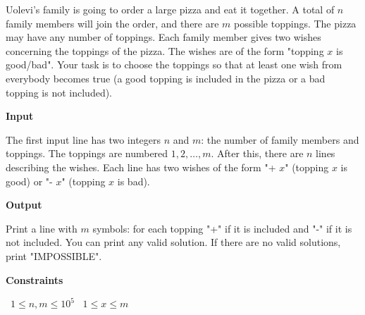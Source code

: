 Uolevi's family is going to order a large pizza and eat it together. A total of $n$ family members will join the order, and there are $m$ possible toppings. The pizza may have any number of toppings.
Each family member gives two wishes concerning the toppings of the pizza. The wishes are of the form "topping $x$ is good/bad". Your task is to choose the toppings so that at least one wish from everybody becomes true (a good topping is included in the pizza or a bad topping is not included).

\vspace{0.3cm}\noindent\textbf{Input}

The first input line has two integers $n$ and $m$: the number of family members and toppings. The toppings are numbered $1,2,\dots,m$.
After this, there are $n$ lines describing the wishes. Each line has two wishes of the form "+ $x$" (topping $x$ is good) or "- $x$" (topping $x$ is bad).

\vspace{0.3cm}\noindent\textbf{Output}

Print a line with $m$ symbols: for each topping "+" if it is included and "-" if it is not included. You can print any valid solution.
If there are no valid solutions, print "IMPOSSIBLE".

\vspace{0.3cm}\noindent\textbf{Constraints}

\textbullet\ $1 \le n,m \le 10^5$
\textbullet\ $1 \le x \le m$